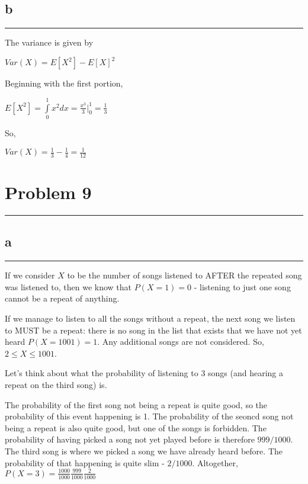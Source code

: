 \documentclass[]{tufte-handout}
\begin{document}
\hypertarget{b-6}{%
\subsection{b}\label{b-6}}

\begin{center}\rule{0.5\linewidth}{0.5pt}\end{center}

The variance is given by

\(Var(X) = E[X^2] - E[X]^2\)

Beginning with the first portion,

\(E[X^2] = \int\limits^1_0 x^2dx = \frac{x^3}{3}\Big|^1_0 = \frac{1}{3}\)

So,

\(Var(X) = \frac{1}{3} - \frac{1}{4} = \frac{1}{12}\)

\hypertarget{problem-9}{%
\section{Problem 9}\label{problem-9}}

\begin{center}\rule{0.5\linewidth}{0.5pt}\end{center}

\hypertarget{a-7}{%
\subsection{a}\label{a-7}}

\begin{center}\rule{0.5\linewidth}{0.5pt}\end{center}

If we consider \(X\) to be the number of songs listened to AFTER the
repeated song was listened to, then we know that \(P(X = 1) = 0\) -
listening to just one song cannot be a repeat of anything.

If we manage to listen to all the songs without a repeat, the next song
we listen to MUST be a repeat: there is no song in the list that exists
that we have not yet heard \(P(X = 1001) = 1\). Any additional songs are
not considered. So, \(2 \le X \le 1001\).

Let's think about what the probability of listening to 3 songs (and
hearing a repeat on the third song) is.

The probability of the first song not being a repeat is quite good, so
the probability of this event happening is 1. The probability of the
seoncd song not being a repeat is also quite good, but one of the songs
is forbidden. The probability of having picked a song not yet played
before is therefore \(999/1000\). The third song is where we picked a
song we have already heard before. The probability of that happening is
quite slim - \(2/1000\). Altogether,
\(P(X = 3) = \frac{1000}{1000}\frac{999}{1000}\frac{2}{1000}\)
\end{document}
